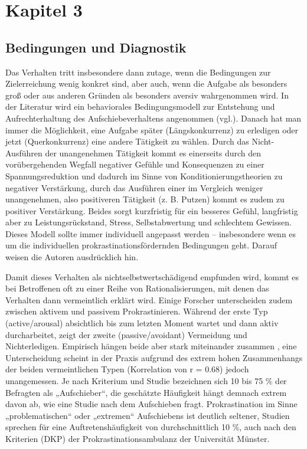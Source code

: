\chapter{Kapitel 3}
\label{cha:kapitel-3}

\section{Bedingungen und Diagnostik}
\label{sec:diagnostik}
Das Verhalten tritt insbesondere dann zutage, wenn die Bedingungen zur Zielerreichung wenig konkret sind, aber auch, wenn die Aufgabe als besonders groß oder aus anderen Gründen als besonders aversiv wahrgenommen wird. In der Literatur wird ein behaviorales Bedingungsmodell zur Entstehung und Aufrechterhaltung des Aufschiebeverhaltens angenommen (vgl.\cite{hoecker:2013}). Danach hat man immer die Möglichkeit, eine Aufgabe später (Längskonkurrenz) zu erledigen oder jetzt (Querkonkurrenz) eine andere Tätigkeit zu wählen. Durch das Nicht-Ausführen der unangenehmen Tätigkeit kommt es einerseits durch den vorübergehenden Wegfall negativer Gefühle und Konsequenzen zu einer Spannungsreduktion und dadurch im Sinne von Konditionierungstheorien zu negativer Verstärkung, durch das Ausführen einer im Vergleich weniger unangenehmen, also positiveren Tätigkeit (z. B. Putzen) kommt es zudem zu positiver Verstärkung. Beides sorgt kurzfristig für ein besseres Gefühl, langfristig aber zu Leistungsrückstand, Stress, Selbstabwertung und schlechtem Gewissen. Dieses Modell sollte immer individuell angepasst werden – insbesondere wenn es um die individuellen prokrastinationsfördernden Bedingungen geht. Darauf weisen die Autoren ausdrücklich hin.

Damit dieses Verhalten als nichtselbstwertschädigend empfunden wird, kommt es bei Betroffenen oft zu einer Reihe von Rationalisierungen, mit denen das Verhalten dann vermeintlich erklärt wird. Einige Forscher unterscheiden zudem zwischen aktivem und passivem Prokrastinieren\cite{wiki}. Während der erste Typ (active/arousal) absichtlich bis zum letzten Moment wartet und dann aktiv durcharbeitet, zeigt der zweite (passive/avoidant) Vermeidung und Nichterledigen. Empirisch hängen beide aber stark miteinander zusammen \cite{wiki}, eine Unterscheidung scheint in der Praxis aufgrund des extrem hohen Zusammenhangs der beiden vermeintlichen Typen (Korrelation von r = 0.68) jedoch unangemessen\cite{wiki}. Je nach Kriterium und Studie bezeichnen sich 10 bis 75 \% der Befragten als „Aufschieber“, die geschätzte Häufigkeit hängt demnach extrem davon ab, wie eine Studie nach dem Aufschieben fragt\cite{wiki}. Prokrastination im Sinne „problematischen“ oder „extremen“ Aufschiebens ist deutlich seltener, Studien sprechen für eine Auftretenshäufigkeit von durchschnittlich 10 \%, auch nach den Kriterien (DKP) der Prokrastinationsambulanz der Universität Münster\cite{hoecker:2013}.

